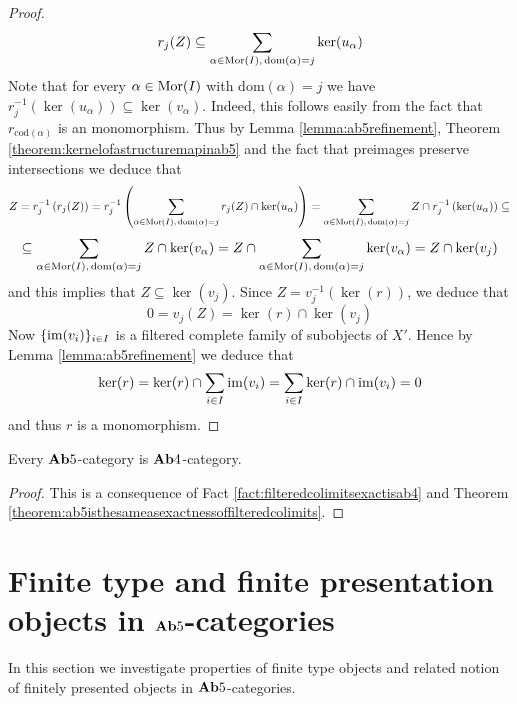 \begin{proof}
$$r_j(Z) \subseteq \sum_{\alpha \in \mathrm{Mor}(I),\, \mathrm{dom}(\alpha)=j}\ker(u_{\alpha})$$
Note that for every $\alpha \in \mathrm{Mor}(I)$ with $\mathrm{dom}(\alpha) = j$ we have $r_j^{-1}\left(\ker(u_{\alpha})\right)\subseteq \ker(v_{\alpha})$. Indeed, this follows easily from the fact that $r_{\mathrm{cod}(\alpha)}$ is an monomorphism. Thus by Lemma \ref{lemma:ab5refinement}, Theorem \ref{theorem:kernelofastructuremapinab5} and the fact that preimages preserve intersections we deduce that
$$Z = r_{j}^{-1}\left(r_j(Z)\right) =r_j^{-1}\left(\sum_{\alpha \in \mathrm{Mor}(I),\,\mathrm{dom}(\alpha) = j}r_j(Z)\cap \ker(u_{\alpha})\right)=\sum_{\alpha \in \mathrm{Mor}(I),\,\mathrm{dom}(\alpha) = j}Z\cap r_j^{-1}\left(\ker(u_{\alpha})\right)\subseteq $$
$$\subseteq \sum_{\alpha \in \mathrm{Mor}(I),\,\mathrm{dom}(\alpha) = j} Z\cap \ker(v_{\alpha}) = Z\cap \sum_{\alpha \in \mathrm{Mor}(I),\,\mathrm{dom}(\alpha) = j} \ker(v_{\alpha}) = Z\cap \ker(v_j)$$
and this implies that $Z\subseteq \ker(v_j)$. Since $Z = v_j^{-1}(\ker(r))$, we deduce that 
$$0 = v_j(Z) = \ker(r)\cap \ker(v_j)$$
Now $\{\mathrm{im}(v_i)\}_{i\in I}$ is a filtered complete family of subobjects of $X'$. Hence by Lemma \ref{lemma:ab5refinement} we deduce that
$$\ker(r) = \ker(r)\cap \sum_{i\in I}\mathrm{im}(v_i) = \sum_{i\in I}\ker(r)\cap \mathrm{im}(v_i) = 0$$
and thus $r$ is a monomorphism.
\end{proof}

\begin{corollary}
Every $\mathbf{Ab}5$-category is $\mathbf{Ab}4$-category.
\end{corollary}
\begin{proof}
This is a consequence of Fact \ref{fact:filteredcolimitsexactisab4} and Theorem \ref{theorem:ab5isthesameasexactnessoffilteredcolimits}.
\end{proof}

\section{Finite type and finite presentation objects in $\mathbf{Ab}5$-categories}
\noindent
In this section we investigate properties of finite type objects and related notion of finitely presented objects in $\mathbf{Ab}5$-categories.

